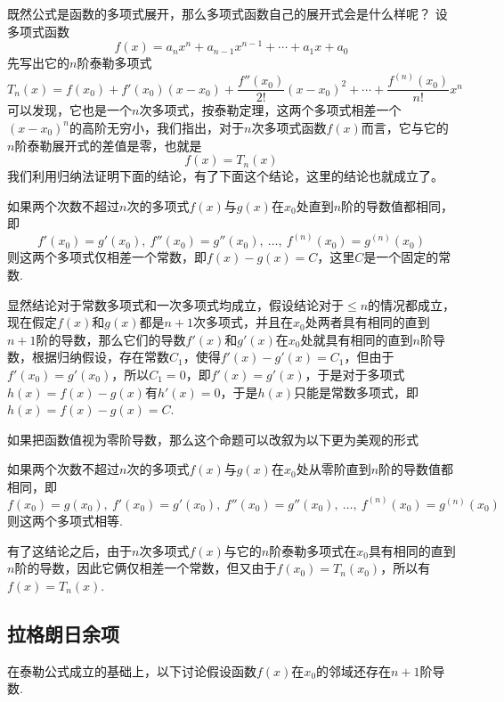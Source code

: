 \begin{example}
  既然公式是函数的多项式展开，那么多项式函数自己的展开式会是什么样呢？ 设多项式函数
  \[ f(x) = a_nx^n+a_{n-1}x^{n-1}+\cdots+a_1x+a_0 \]
  先写出它的$n$阶泰勒多项式
\[ T_n(x) = f(x_0) + f'(x_0)(x-x_0)+\frac{f''(x_0)}{2!}(x-x_0)^2+ \cdots +\frac{f^{(n)}(x_0)}{n!}x^n \]
可以发现，它也是一个$n$次多项式，按泰勒定理，这两个多项式相差一个$(x-x_0)^n$的高阶无穷小，我们指出，对于$n$次多项式函数$f(x)$而言，它与它的$n$阶泰勒展开式的差值是零，也就是
\[ f(x) = T_n(x) \]
我们利用归纳法证明下面的结论，有了下面这个结论，这里的结论也就成立了。

\begin{statement}
  如果两个次数不超过$n$次的多项式$f(x)$与$g(x)$在$x_0$处直到$n$阶的导数值都相同，即
  \[ f'(x_0) = g'(x_0), \  f''(x_0) = g''(x_0), \  \ldots, \  f^{(n)}(x_0) = g^{(n)}(x_0) \]
  则这两个多项式仅相差一个常数，即$f(x)-g(x)=C$，这里$C$是一个固定的常数.
\end{statement}

显然结论对于常数多项式和一次多项式均成立，假设结论对于$\leqslant n$的情况都成立，现在假定$f(x)$和$g(x)$都是$n+1$次多项式，并且在$x_0$处两者具有相同的直到$n+1$阶的导数，那么它们的导数$f'(x)$和$g'(x)$在$x_0$处就具有相同的直到$n$阶导数，根据归纳假设，存在常数$C_1$，使得$f'(x)-g'(x)=C_1$，但由于$f'(x_0)=g'(x_0)$，所以$C_1=0$，即$f'(x)=g'(x)$，于是对于多项式$h(x)=f(x)-g(x)$有$h'(x)=0$，于是$h(x)$只能是常数多项式，即$h(x)=f(x)-g(x)=C$.
\end{example}

如果把函数值视为零阶导数，那么这个命题可以改叙为以下更为美观的形式
\begin{statement}
  如果两个次数不超过$n$次的多项式$f(x)$与$g(x)$在$x_0$处从零阶直到$n$阶的导数值都相同，即
  \[ f(x_0)=g(x_0), \  f'(x_0) = g'(x_0), \  f''(x_0) = g''(x_0), \  \ldots, \  f^{(n)}(x_0) = g^{(n)}(x_0) \]
  则这两个多项式相等.
\end{statement}

有了这结论之后，由于$n$次多项式$f(x)$与它的$n$阶泰勒多项式在$x_0$具有相同的直到$n$阶的导数，因此它俩仅相差一个常数，但又由于$f(x_0)=T_n(x_0)$，所以有$f(x)=T_n(x)$.

\subsection{拉格朗日余项}
\label{sec:taylor-additional-of-lagrange}

在泰勒公式成立的基础上，以下讨论假设函数$f(x)$在$x_0$的邻域还存在$n+1$阶导数.


